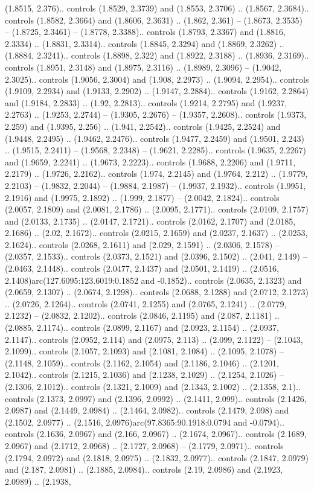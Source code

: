 (1.8515, 2.376).. controls (1.8529, 2.3739) and (1.8553, 2.3706) .. (1.8567, 2.3684).. controls (1.8582, 2.3664) and (1.8606, 2.3631) .. (1.862, 2.361) -- (1.8673, 2.3535) -- (1.8725, 2.3461) -- (1.8778, 2.3388).. controls (1.8793, 2.3367) and (1.8816, 2.3334) .. (1.8831, 2.3314).. controls (1.8845, 2.3294) and (1.8869, 2.3262) .. (1.8884, 2.3241).. controls (1.8898, 2.322) and (1.8922, 2.3188) .. (1.8936, 2.3169).. controls (1.8951, 2.3148) and (1.8975, 2.3116) .. (1.8989, 2.3096) -- (1.9042, 2.3025).. controls (1.9056, 2.3004) and (1.908, 2.2973) .. (1.9094, 2.2954).. controls (1.9109, 2.2934) and (1.9133, 2.2902) .. (1.9147, 2.2884).. controls (1.9162, 2.2864) and (1.9184, 2.2833) .. (1.92, 2.2813).. controls (1.9214, 2.2795) and (1.9237, 2.2763) .. (1.9253, 2.2744) -- (1.9305, 2.2676) -- (1.9357, 2.2608).. controls (1.9373, 2.259) and (1.9395, 2.256) .. (1.941, 2.2542).. controls (1.9425, 2.2524) and (1.9448, 2.2495) .. (1.9462, 2.2476).. controls (1.9477, 2.2459) and (1.9501, 2.243) .. (1.9515, 2.2411) -- (1.9568, 2.2348) -- (1.9621, 2.2285).. controls (1.9635, 2.2267) and (1.9659, 2.2241) .. (1.9673, 2.2223).. controls (1.9688, 2.2206) and (1.9711, 2.2179) .. (1.9726, 2.2162).. controls (1.974, 2.2145) and (1.9764, 2.212) .. (1.9779, 2.2103) -- (1.9832, 2.2044) -- (1.9884, 2.1987) -- (1.9937, 2.1932).. controls (1.9951, 2.1916) and (1.9975, 2.1892) .. (1.999, 2.1877) -- (2.0042, 2.1824).. controls (2.0057, 2.1809) and (2.0081, 2.1786) .. (2.0095, 2.1771).. controls (2.0109, 2.1757) and (2.0133, 2.1735) .. (2.0147, 2.1721).. controls (2.0162, 2.1707) and (2.0185, 2.1686) .. (2.02, 2.1672).. controls (2.0215, 2.1659) and (2.0237, 2.1637) .. (2.0253, 2.1624).. controls (2.0268, 2.1611) and (2.029, 2.1591) .. (2.0306, 2.1578) -- (2.0357, 2.1533).. controls (2.0373, 2.1521) and (2.0396, 2.1502) .. (2.041, 2.149) -- (2.0463, 2.1448).. controls (2.0477, 2.1437) and (2.0501, 2.1419) .. (2.0516, 2.1408)arc(127.6095:123.6019:0.1852 and -0.1852).. controls (2.0635, 2.1323) and (2.0659, 2.1307) .. (2.0674, 2.1298).. controls (2.0688, 2.1288) and (2.0712, 2.1273) .. (2.0726, 2.1264).. controls (2.0741, 2.1255) and (2.0765, 2.1241) .. (2.0779, 2.1232) -- (2.0832, 2.1202).. controls (2.0846, 2.1195) and (2.087, 2.1181) .. (2.0885, 2.1174).. controls (2.0899, 2.1167) and (2.0923, 2.1154) .. (2.0937, 2.1147).. controls (2.0952, 2.114) and (2.0975, 2.113) .. (2.099, 2.1122) -- (2.1043, 2.1099).. controls (2.1057, 2.1093) and (2.1081, 2.1084) .. (2.1095, 2.1078) -- (2.1148, 2.1059).. controls (2.1162, 2.1054) and (2.1186, 2.1046) .. (2.1201, 2.1042).. controls (2.1215, 2.1036) and (2.1238, 2.1029) .. (2.1254, 2.1026) -- (2.1306, 2.1012).. controls (2.1321, 2.1009) and (2.1343, 2.1002) .. (2.1358, 2.1).. controls (2.1373, 2.0997) and (2.1396, 2.0992) .. (2.1411, 2.099).. controls (2.1426, 2.0987) and (2.1449, 2.0984) .. (2.1464, 2.0982).. controls (2.1479, 2.098) and (2.1502, 2.0977) .. (2.1516, 2.0976)arc(97.8365:90.1918:0.0794 and -0.0794).. controls (2.1636, 2.0967) and (2.166, 2.0967) .. (2.1674, 2.0967).. controls (2.1689, 2.0967) and (2.1712, 2.0968) .. (2.1727, 2.0968) -- (2.1779, 2.0971).. controls (2.1794, 2.0972) and (2.1818, 2.0975) .. (2.1832, 2.0977).. controls (2.1847, 2.0979) and (2.187, 2.0981) .. (2.1885, 2.0984).. controls (2.19, 2.0986) and (2.1923, 2.0989) .. (2.1938, 